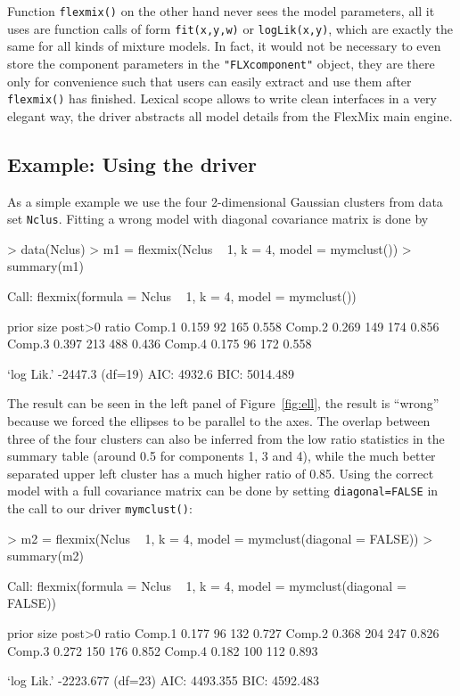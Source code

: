 \documentclass{jss}
\begin{document}
Function \texttt{flexmix()} on the other hand never sees the model
parameters, all it uses are function calls of form \texttt{fit(x,y,w)}
or \texttt{logLik(x,y)}, which are exactly the same for all kinds of
mixture models. In fact, it would not be necessary to even store the
component parameters in the \texttt{"FLXcomponent"} object, they are
there only for convenience such that users can easily extract and use
them after \texttt{flexmix()} has finished. Lexical scope allows to
write clean interfaces in a very elegant way, the driver abstracts all
model details from the FlexMix main engine.



\subsection{Example: Using the driver}
\label{sec:example:-model-based}




As a simple example we use the four 2-dimensional Gaussian clusters
from data set \texttt{Nclus}. Fitting a wrong model with diagonal
covariance matrix is done by
\begin{Schunk}
\begin{Sinput}
> data(Nclus)
> m1 = flexmix(Nclus ~ 1, k = 4, model = mymclust())
> summary(m1)
\end{Sinput}
\begin{Soutput}
Call:
flexmix(formula = Nclus ~ 1, k = 4, model = mymclust())

       prior size post>0 ratio
Comp.1 0.159   92    165 0.558
Comp.2 0.269  149    174 0.856
Comp.3 0.397  213    488 0.436
Comp.4 0.175   96    172 0.558

`log Lik.' -2447.3 (df=19)
AIC: 4932.6   BIC: 5014.489 
\end{Soutput}
\end{Schunk}

The result can be seen in the left panel of Figure~\ref{fig:ell}, the
result is ``wrong'' because we forced the ellipses to be parallel to
the axes. The overlap between three of the four clusters can also be
inferred from the low ratio statistics in the summary table (around
0.5 for components 1, 3 and 4), while the much better separated upper
left cluster has a much higher ratio of 0.85. Using the correct model
with a full covariance matrix can be done by setting
\texttt{diagonal=FALSE} in the call to our driver \texttt{mymclust()}:
\begin{Schunk}
\begin{Sinput}
> m2 = flexmix(Nclus ~ 1, k = 4, model = mymclust(diagonal = FALSE))
> summary(m2)
\end{Sinput}
\begin{Soutput}
Call:
flexmix(formula = Nclus ~ 1, k = 4, model = mymclust(diagonal = FALSE))

       prior size post>0 ratio
Comp.1 0.177   96    132 0.727
Comp.2 0.368  204    247 0.826
Comp.3 0.272  150    176 0.852
Comp.4 0.182  100    112 0.893

`log Lik.' -2223.677 (df=23)
AIC: 4493.355   BIC: 4592.483 
\end{Soutput}
\end{Schunk}
\end{document}
